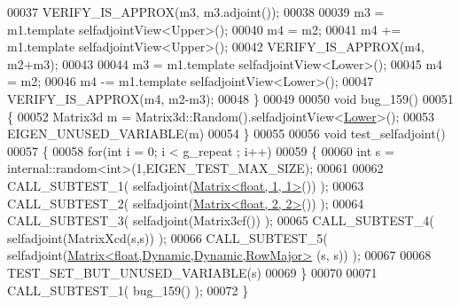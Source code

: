 \begin{DoxyCode}
00037   VERIFY\_IS\_APPROX(m3, m3.adjoint());
00038 
00039   m3 = m1.template selfadjointView<Upper>();
00040   m4 = m2;
00041   m4 += m1.template selfadjointView<Upper>();
00042   VERIFY\_IS\_APPROX(m4, m2+m3);
00043 
00044   m3 = m1.template selfadjointView<Lower>();
00045   m4 = m2;
00046   m4 -= m1.template selfadjointView<Lower>();
00047   VERIFY\_IS\_APPROX(m4, m2-m3);
00048 \}
00049 
00050 \textcolor{keywordtype}{void} bug\_159()
00051 \{
00052   Matrix3d m = Matrix3d::Random().selfadjointView<\hyperlink{group__enums_gga39e3366ff5554d731e7dc8bb642f83cda891792b8ed394f7607ab16dd716f60e6}{Lower}>();
00053   EIGEN\_UNUSED\_VARIABLE(m)
00054 \}
00055 
00056 \textcolor{keywordtype}{void} test\_selfadjoint()
00057 \{
00058   \textcolor{keywordflow}{for}(\textcolor{keywordtype}{int} i = 0; i < g\_repeat ; i++)
00059   \{
00060     \textcolor{keywordtype}{int} s = internal::random<int>(1,EIGEN\_TEST\_MAX\_SIZE);
00061 
00062     CALL\_SUBTEST\_1( selfadjoint(\hyperlink{group___core___module_class_eigen_1_1_matrix}{Matrix<float, 1, 1>}()) );
00063     CALL\_SUBTEST\_2( selfadjoint(\hyperlink{group___core___module_class_eigen_1_1_matrix}{Matrix<float, 2, 2>}()) );
00064     CALL\_SUBTEST\_3( selfadjoint(Matrix3cf()) );
00065     CALL\_SUBTEST\_4( selfadjoint(MatrixXcd(s,s)) );
00066     CALL\_SUBTEST\_5( selfadjoint(\hyperlink{group___core___module_class_eigen_1_1_matrix}{Matrix<float,Dynamic,Dynamic,RowMajor>}
      (s, s)) );
00067     
00068     TEST\_SET\_BUT\_UNUSED\_VARIABLE(s)
00069   \}
00070   
00071   CALL\_SUBTEST\_1( bug\_159() );
00072 \}
\end{DoxyCode}
